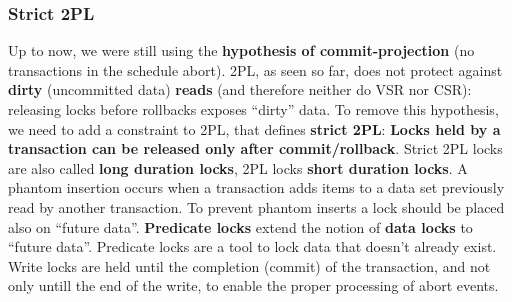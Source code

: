 \subsubsection{Strict 2PL}
Up to now, we were still using the \textbf{hypothesis of
commit-projection} (no transactions in the schedule
abort).\newline
2PL, as seen so far, does not protect against \textbf{dirty} (uncommitted data) \textbf{reads} (and therefore neither do VSR nor CSR): releasing locks before rollbacks exposes “dirty” data.\newline
\newline
To remove this hypothesis, we need to add a constraint to
2PL, that defines \textbf{strict 2PL}: \textbf{Locks held by a transaction can be released only after
commit/rollback}.\newline
\newline
Strict 2PL locks are also called \textbf{long duration locks}, 2PL locks \textbf{short duration locks}.\newline
\newline
A phantom insertion occurs when a transaction adds items to a data set previously read by another transaction. To prevent phantom inserts a lock should be placed also on
“future data”.\newline
\newline
\textbf{Predicate locks} extend the notion of \textbf{data locks} to “future data”. Predicate locks are a tool to lock data that doesn't already exist.\newline
\newline
Write locks are held until the completion (commit) of the transaction, and not only untill the end of the write, to enable the proper processing of abort events.
